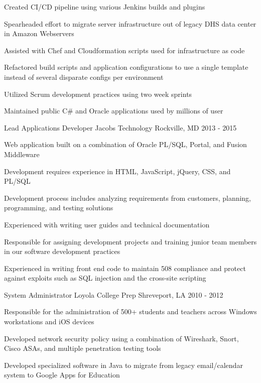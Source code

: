 \begin{cventries}
{\begin{cvitems}
        \item {Created CI/CD pipeline using various Jenkins builds and plugins}
        \item {Spearheaded effort to migrate server infrastructure out of legacy DHS data center in Amazon Webservers}
        \item {Assisted with Chef and Cloudformation scripts used for infrastructure as code}
        \item {Refactored build scripts and application configurations to use a single template instead of several disparate configs per environment}
        \item {Utilized Scrum development practices using two week sprints}
        \item {Maintained public C\# and Oracle applications used by millions of user}
      \end{cvitems}
    }

  \cventry
    {Lead Applications Developer} %
    {Jacobs Technology} %
    {Rockville, MD} %
    {2013 - 2015} %
    {
      \begin{cvitems} %
        \item {Web application built on a combination of Oracle PL/SQL, Portal, and Fusion Middleware}
        \item {Development requires experience in HTML, JavaScript, jQuery, CSS, and PL/SQL}
        \item {Development process includes analyzing requirements from customers, planning, programming, and testing solutions}
        \item {Experienced with writing user guides and technical documentation}
        \item {Responsible for assigning development projects and training junior team members in our software development practices}
        \item {Experienced in writing front end code to maintain 508 compliance and protect against exploits such as SQL injection and the cross-site scripting}
      \end{cvitems}
    }

  \cventry
    {System Administrator} %
    {Loyola College Prep} %
    {Shreveport, LA} %
    {2010 - 2012} %
    {
      \begin{cvitems} %
        \item {Responsible for the administration of 500+ students and teachers across Windows workstations and iOS devices}
        \item {Developed network security policy using a combination of Wireshark, Snort, Cisco ASAs, and multiple penetration testing tools}
        \item {Developed specialized software in Java to migrate from legacy email/calendar system to Google Apps for Education}
      \end{cvitems}
    }

\end{cventries}
